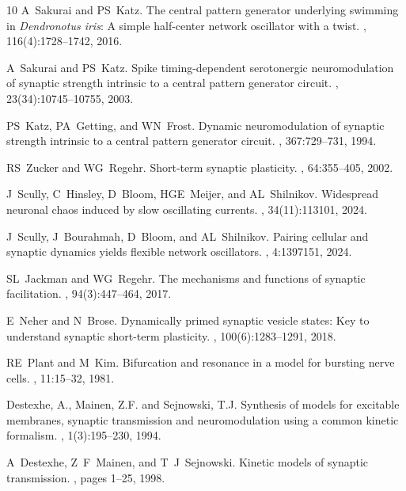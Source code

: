 \documentclass[nofootinbib,aip,amsmath,amssymb,preprint,twocolumn,floatfix,10pt]{revtex4-2}
\begin{document}
\begin{thebibliography}{10}
A~Sakurai and PS~Katz.
\newblock  The central pattern generator underlying swimming in \emph{Dendronotus iris}: A simple half-center network oscillator with a twist.
 , 116(4):1728--1742, 2016.

A~Sakurai and PS~Katz.
\newblock Spike timing-dependent serotonergic neuromodulation of synaptic strength intrinsic to a central pattern generator circuit.
, 23(34):10745--10755, 2003.

PS~Katz, PA~Getting, and WN~Frost.
\newblock Dynamic neuromodulation of synaptic strength intrinsic to a central pattern generator circuit.
, 367:729--731, 1994.

RS~Zucker and WG~Regehr.
\newblock Short-term synaptic plasticity.
, 64:355--405, 2002.

J~Scully, C~Hinsley, D~Bloom, HGE~Meijer, and AL~Shilnikov.
\newblock Widespread neuronal chaos induced by slow oscillating currents.
, 34(11):113101, 2024.

J~Scully, J~Bourahmah, D~Bloom, and AL~Shilnikov.
\newblock Pairing cellular and synaptic dynamics yields flexible network oscillators.
, 4:1397151, 2024.

SL~Jackman and WG~Regehr.
\newblock The mechanisms and functions of synaptic facilitation.
, 94(3):447--464, 2017.

E~Neher and N~Brose.
\newblock Dynamically primed synaptic vesicle states: Key to understand synaptic short-term plasticity.
, 100(6):1283--1291, 2018.

RE~Plant and M~Kim.
\newblock Bifurcation and resonance in a model for bursting nerve cells.
, 11:15--32, 1981.

Destexhe, A., Mainen, Z.F. and Sejnowski, T.J.
\newblock Synthesis of models for excitable membranes, synaptic transmission and neuromodulation using a common kinetic formalism.
, 1(3):195--230, 1994.

A~Destexhe, Z~F~Mainen, and T~J~Sejnowski.
\newblock Kinetic models of synaptic transmission.
, pages 1--25, 1998.


\end{thebibliography}
\end{document}
